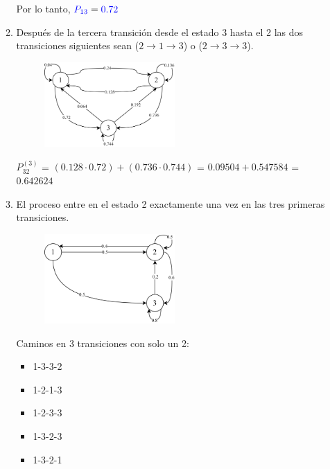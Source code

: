 \documentclass{templateNote}
\begin{document}
\begin{enumerate}[start = 3]
\begin{enumerate}[label=\alph*)]
        Por lo tanto, $\textcolor{blue}{P_{13}} = \textcolor{blue}{0.72}$

        \item Después de la tercera transición desde el estado 3 hasta el 2 las dos transiciones siguientes sean ($2\rightarrow1\rightarrow3$) o ($2\rightarrow3\rightarrow3$).
        
        \begin{figure}[H]
            \centering
            \includegraphics[width=0.5\textwidth]{img/ejer4_2.png}
        \end{figure}

        $P_{32}^{(3)}$ = $(0.128\cdot0.72) + (0.736\cdot0.744)$ = $0.09504 + 0.547584$ = $0.642624$
        
        \item El proceso entre en el estado 2 exactamente una vez en las tres primeras transiciones.
        \begin{figure}[H]
            \centering
            \includegraphics[width=0.5\textwidth]{img/ejer42_2.png}
        \end{figure}

        \newpage
        Caminos en 3 transiciones con solo un 2:
        \begin{itemize}
            \item 1-3-3-2
            \item 1-2-1-3
            \item 1-2-3-3
            \item 1-3-2-3
            \item 1-3-2-1
        \end{itemize}


\end{enumerate}
\end{enumerate}
\end{document}
